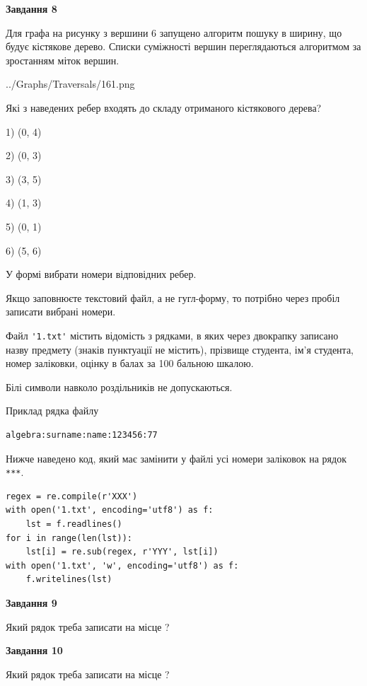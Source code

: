 \documentclass[12pt, ukrainian]{article}
\def\code#1{\Verb!#1!}
\begin{document}
{\begin {large}
{\begin {center}\textbf{Завдання 8}\end {center}}\par
Для графа на рисунку з вершини 6 запущено алгоритм пошуку в ширину, що будує кістякове дерево. Списки суміжності вершин переглядаються алгоритмом за зростанням міток вершин.\par
\begin{center}
	{../Graphs/Traversals/161.png}
\end{center}
\par Які з наведених ребер входять до складу отриманого кістякового дерева?\par
1) (0, 4)\par
2) (0, 3)\par
3) (3, 5)\par
4) (1, 3)\par
5) (0, 1)\par
6) (5, 6)\par
{\vskip 15pt} У формі вибрати номери відповідних ребер.


Якщо заповнюєте текстовий файл, а не гугл-форму, то потрібно через пробіл записа\-ти вибрані номери.\par
\newpage


Файл \code{'1.txt'} містить відомість з рядками, в яких через двокрапку записа\-но назву предмету (знаків пунктуації не містить), прізвище студента, ім'я студента, номер залі\-ков\-ки, оцінку в балах за 100 бальною шкалою.

Білі символи навколо роздільників не допускаються.

Приклад рядка файлу



\begin{verbatim}
algebra:surname:name:123456:77
\end{verbatim}


Нижче наведено код, який має замінити у файлі усі номери заліковок на рядок \code{***}.



\begin{verbatim}
regex = re.compile(r'XXX')
with open('1.txt', encoding='utf8') as f:
    lst = f.readlines()
for i in range(len(lst)):
    lst[i] = re.sub(regex, r'YYY', lst[i])
with open('1.txt', 'w', encoding='utf8') as f:
    f.writelines(lst)
\end{verbatim}




{\begin {center}\textbf{Завдання 9}\end {center}}\par
Який рядок треба записати на місце  ?\par
\vspace{5mm}


{\begin {center}\textbf{Завдання 10}\end {center}}\par
Який рядок треба записати на місце  ?\par


\newpage


\end {large}}
\end{document}
